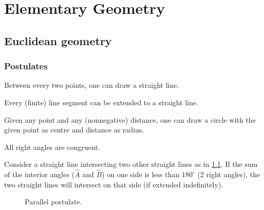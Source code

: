 \chapter{Elementary Geometry}

\minitoc

\section{Euclidean geometry}
\subsection{Postulates}

    \begin{axiom}
        Between every two points, one can draw a straight line.
    \end{axiom}

    \begin{axiom}
        Every (finite) line segment can be extended to a straight line.
    \end{axiom}

    \begin{axiom}
        Given any point and any (nonnegative) distance, one can draw a circle with the given point as centre and distance as radius.
    \end{axiom}

    \begin{axiom}
        All right angles are congruent.
    \end{axiom}

    \begin{axiom}
        Consider a straight line intersecting two other straight lines as in \cref{fig:parallel_postulate}. If the sum of the interior angles ($\hat{A}$ and $\hat{B}$) on one side is less than $180^\circ$ (2 right angles), the two straight lines will intersect on that side (if extended indefinitely).
    \end{axiom}

    \begin{figure}[t!]
        \centering
        \caption{Parallel postulate.}
        \label{fig:parallel_postulate}
    \end{figure}

